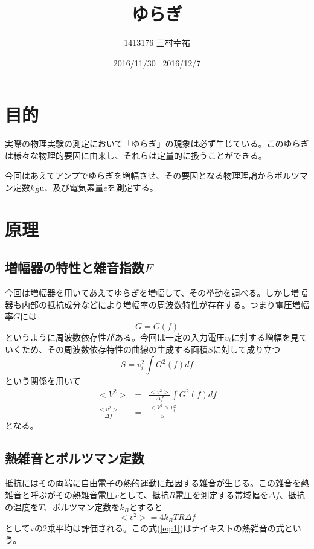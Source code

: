 \documentclass[11pt,a4j]{jsarticle}
\title{ゆらぎ}
\author{1413176 三村幸祐}
\date{2016/11/30 \, 2016/12/7}
\begin{document}
  
  
  
 \section{目的}
  実際の物理実験の測定において「ゆらぎ」の現象は必ず生じている。このゆらぎは様々な物理的要因に由来し、それらは定量的に扱うことができる。
  
  今回はあえてアンプでゆらぎを増幅させ、その要因となる物理理論からボルツマン定数$k_B$u、及び電気素量$e$を測定する。
  
  
 \section{原理}
   
   \subsection{増幅器の特性と雑音指数$F$}
  今回は増幅器を用いてあえてゆらぎを増幅して、その挙動を調べる。しかし増幅器も内部の抵抗成分などにより増幅率の周波数特性が存在する。つまり電圧増幅率$G$には
  \begin{equation}
  G = G(f)
  \end{equation}
  というように周波数依存性がある。今回は一定の入力電圧$v_i$に対する増幅を見ていくため、その周波数依存特性の曲線の生成する面積$S$に対して成り立つ
  \begin{equation}
  S = v_i^2 \int G^2 (f) df
  \end{equation}
  という関係を用いて
  \begin{eqnarray}
  <V^2> &=& \frac{<v^2>}{\Delta f} \int G^2 (f) df \\
  \frac{<v^2>}{\Delta f} &=& \frac{<V^2> v_i^2}{S} \label{eq:13}
  \end{eqnarray}
  となる。
   
   \subsection{熱雑音とボルツマン定数}
   抵抗にはその両端に自由電子の熱的運動に起因する雑音が生じる。この雑音を熱雑音と呼ぶがその熱雑音電圧$v$として、抵抗$R$電圧を測定する帯域幅を$\Delta f$、抵抗の温度を$T$、ボルツマン定数を$k_B$とすると
   \begin{equation}
   <v^2> = 4k_B TR \Delta f
   \label{eq:1}
   \end{equation}
   としてvの2乗平均は評価される。この式(\ref{eq:1})はナイキストの熱雑音の式という。
   
\end{document}
